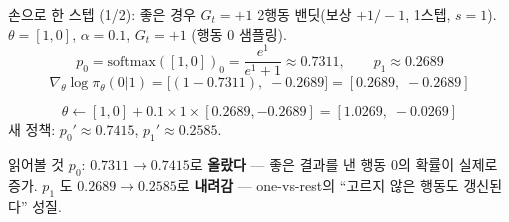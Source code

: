 \begin{frame}{손으로 한 스텝 (1/2): 좋은 경우 $G_t = +1$}
  2행동 밴딧(보상 $+1/-1$, 1스텝, $s=1$).
  $\theta=[1,0]$, $\alpha=0.1$, $G_t=+1$ (행동 0 샘플링).
  \[
  p_0 = \text{softmax}([1,0])_0 = \frac{e^1}{e^1+1} \approx 0.7311,
  \qquad p_1 \approx 0.2689
  \]
  \[
  \nabla_\theta \log\pi_\theta(0|1) = \big[(1-0.7311),\; -0.2689\big]
  = [0.2689,\; -0.2689]
  \]
  
  \[
  \theta \leftarrow [1,0] + 0.1 \times 1 \times [0.2689, -0.2689]
  = [1.0269,\; -0.0269]
  \]
  새 정책: $p_0' \approx \mathbf{0.7415}$, $p_1' \approx 0.2585$.
  \begin{block}{읽어볼 것}
    $p_0$: $0.7311 \to \mathbf{0.7415}$로 \textbf{올랐다} ---
    좋은 결과를 낸 행동 0의 확률이 실제로 증가.
    $p_1$ 도 $0.2689 \to 0.2585$로 \textbf{내려감} ---
    one-vs-rest의 ``고르지 않은 행동도 갱신된다'' 성질.
  \end{block}

\end{frame}
